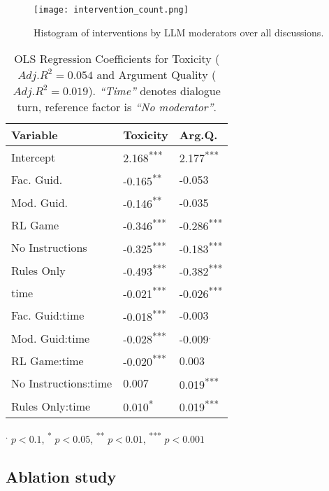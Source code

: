 \begin{figure}
	\centering
	\texttt{[image: intervention\_count.png]}
	\caption{Histogram of interventions by LLM moderators over all discussions.}
	\label{fig::intervention_count}
\end{figure}

\begin{table}[htbp]
    \centering
    \begin{tabular}{lll}
        \toprule
        \textbf{Variable} & \textbf{Toxicity} & \textbf{Arg.Q.} \\
        \midrule
        Intercept & 2.168\textsuperscript{***} & 2.177\textsuperscript{***} \\
        Fac. Guid. & -0.165\textsuperscript{**} & -0.053 \\
        Mod. Guid. & -0.146\textsuperscript{**} & -0.035 \\
        \ac{RL} Game & -0.346\textsuperscript{***} & -0.286\textsuperscript{***} \\
        No Instructions & -0.325\textsuperscript{***} & -0.183\textsuperscript{***} \\
        Rules Only & -0.493\textsuperscript{***} & -0.382\textsuperscript{***} \\
        time & -0.021\textsuperscript{***} & -0.026\textsuperscript{***} \\
        Fac. Guid:time & -0.018\textsuperscript{***} & -0.003 \\
        Mod. Guid:time & -0.028\textsuperscript{***} & -0.009\textsuperscript{.} \\
        \ac{RL} Game:time & -0.020\textsuperscript{***} & 0.003 \\
        No Instructions:time & 0.007 & 0.019\textsuperscript{***} \\
        Rules Only:time & 0.010\textsuperscript{*} & 0.019\textsuperscript{***} \\
        \bottomrule
    \end{tabular}
    \smallskip
    \small
    \textsuperscript{.} $p<0.1$, \textsuperscript{*} $p<0.05$, \textsuperscript{**} $p<0.01$, \textsuperscript{***} $p<0.001$
    \normalsize
    \caption{OLS Regression Coefficients for Toxicity ($Adj. R^2=0.054$ and Argument Quality ($Adj. R^2=0.019$). \textit{“Time”} denotes dialogue turn, reference factor is \textit{“No moderator”}.}
    \label{tab:timeseries}
\end{table}


\subsection{Ablation study}

